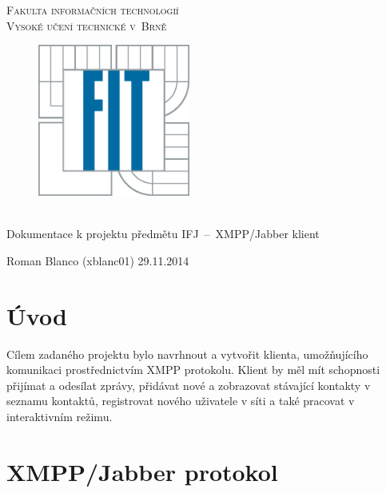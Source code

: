 \documentclass[11pt,a4paper]{article}
\begin{document}
  \begin{titlepage}
    \begin{center}
      \Huge
      \textsc{Fakulta informačních technologií \\
              Vysoké učení technické v~Brně}
      \vspace{100px}
      \begin{figure}[!h]
        \centering
        \includegraphics[height=5cm]{logo}
      \end{figure}
      \\[50mm]
      \LARGE{Dokumentace k projektu předmětu IFJ \,--\, XMPP/Jabber klient}
      \vfill
    \end{center}
    \Large{Roman Blanco (xblanc01) \hfill 29.11.2014}

  \end{titlepage}

  \pagestyle{plain}
  \thispagestyle{empty}
  \tableofcontents
  \newpage

  \pagestyle{plain}
  \setcounter{page}{3}
  
  \setlength{\parindent}{1cm}
  \setlength{\parskip}{0.5cm plus4mm minus3mm}

  \section{Úvod} \label{uvod}

    Cílem zadaného projektu bylo navrhnout a vytvořit klienta, umožňujícího
    komunikaci prostřednictvím XMPP protokolu. Klient by měl mít schopnosti 
    přijímat a odesílat zprávy, přidávat nové a zobrazovat stávající kontakty
    v seznamu kontaktů, registrovat nového uživatele v síti a také pracovat v
    interaktivním režimu.

  \section{XMPP/Jabber protokol} \label{xmpp}
\end{document}
